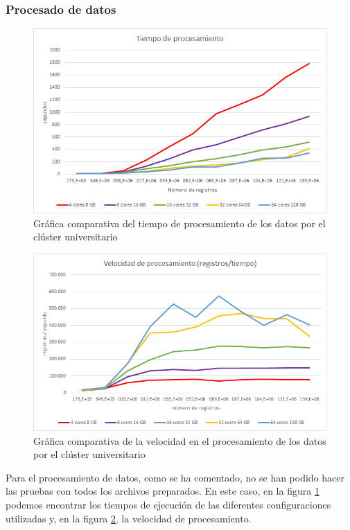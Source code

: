 \subsubsection{Procesado de datos}
\begin{figure}[htp!]
	\centering
	\caption{Gráfica comparativa del tiempo de procesamiento de los datos por el clúster universitario}
	\label{gra:tiemProcUni}
	\vspace{5pt}
	\includegraphics[scale=0.8]{graficas/tpuni}
\end{figure}
\begin{figure}[htp!]
	\centering
	\caption{Gráfica comparativa de la velocidad en el procesamiento de los datos por el clúster universitario}
	\label{gra:velProcUni}
	\vspace{5pt}
	\includegraphics[scale=0.85]{graficas/vpuni}
\end{figure}

Para el procesamiento de datos, como se ha comentado, no se han podido hacer las pruebas con todos los archivos preparados. En este caso, en la figura \ref{gra:tiemProcUni} podemos encontrar los tiempos de ejecución de las diferentes configuraciones utilizadas y, en la figura \ref{gra:velProcUni}, la velocidad de procesamiento.

